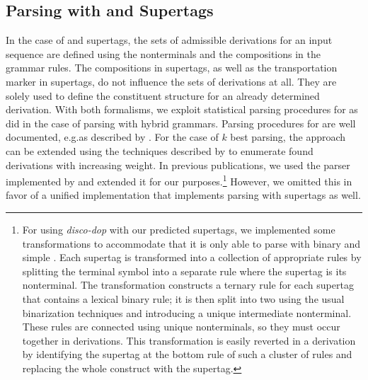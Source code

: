 \documentclass[../../document.tex]{subfiles}
\begin{document}
    \subsection{Parsing with  and  Supertags}\label{sec:parsing:lcfrs}
    In the case of  and  supertags, the sets of admissible derivations for an input sequence are defined using the nonterminals and the  compositions in the grammar rules.
    The  compositions in  supertags, as well as the transportation marker in  supertags, do not influence the sets of derivations at all.
    They are solely used to define the constituent structure for an already determined derivation.
    With both formalisms, we exploit statistical parsing procedures for  as \citet{Geb20} did in the case of parsing with hybrid grammars.
    Parsing procedures for  are well documented, e.g.\@ as described by \citet[Section~7.1]{Kal10}.
    For the case of \(k\) best parsing, the approach can be extended using the techniques described by \citet{HuaChia05} to enumerate found derivations with increasing weight.
    In previous publications, we used the  parser implemented by \citet{CraSchBod16} and extended it for our purposes.\footnote{
        For using \emph{disco-dop} with our predicted supertags, we implemented some transformations to accommodate that it is only able to parse with binary and simple .
        Each supertag is transformed into a collection of appropriate rules by splitting the terminal symbol into a separate rule where the supertag is its  nonterminal.
        The transformation constructs a ternary rule for each supertag that contains a lexical binary rule; it is then split into two using the usual binarization techniques and introducing a unique intermediate nonterminal.
        These rules are connected using unique nonterminals, so they must occur together in derivations.
        This transformation is easily reverted in a derivation by identifying the supertag at the bottom rule of such a cluster of rules and replacing the whole construct with the supertag.
    }
    However, we omitted this in favor of a unified implementation that implements parsing with  supertags as well.
\end{document}
